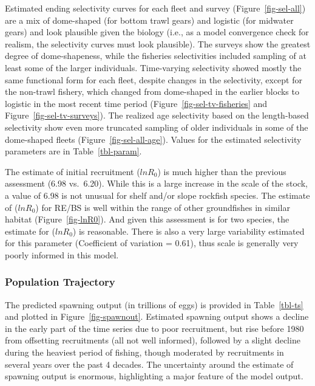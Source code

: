 \documentclass[
]{scrartcl}
\begin{document}
Estimated ending selectivity curves for each fleet and survey
(Figure~\ref{fig-sel-all}) are a mix of dome-shaped (for bottom trawl
gears) and logistic (for midwater gears) and look plausible given the
biology (i.e., as a model convergence check for realism, the selectivity
curves must look plausible). The surveys show the greatest degree of
dome-shapeness, while the fisheries selectivities included sampling of
at least some of the larger individuals. Time-varying selectivity showed
mostly the same functional form for each fleet, despite changes in the
selectivity, except for the non-trawl fishery, which changed from
dome-shaped in the earlier blocks to logistic in the most recent time
period (Figure~\ref{fig-sel-tv-fisheries} and
Figure~\ref{fig-sel-tv-surveys}). The realized age selectivity based on
the length-based selectivity show even more truncated sampling of older
individuals in some of the dome-shaped fleets
(Figure~\ref{fig-sel-all-age}). Values for the estimated selectivity
parameters are in Table~\ref{tbl-param}.

The estimate of initial recruitment (\(lnR_0\)) is much higher than the
previous assessment (6.98 vs.~6.20). While this is a large increase in
the scale of the stock, a value of 6.98 is not unusual for shelf and/or
slope rockfish species. The estimate of (\(lnR_0\)) for RE/BS is well
within the range of other groundfishes in similar habitat
(Figure~\ref{fig-lnR0}). And given this assessment is for two species,
the estimate for (\(lnR_0\)) is reasonable. There is also a very large
variability estimated for this parameter (Coefficient of variation =
0.61), thus scale is generally very poorly informed in this model.

\subsubsection{Population Trajectory}\label{population-trajectory}

The predicted spawning output (in trillions of eggs) is provided in
Table~\ref{tbl-ts} and plotted in Figure~\ref{fig-spawnout}. Estimated
spawning output shows a decline in the early part of the time series due
to poor recruitment, but rise before 1980 from offsetting recruitments
(all not well informed), followed by a slight decline during the
heaviest period of fishing, though moderated by recruitments in several
years over the past 4 decades. The uncertainty around the estimate of
spawning output is enormous, highlighting a major feature of the model
output.
\end{document}
